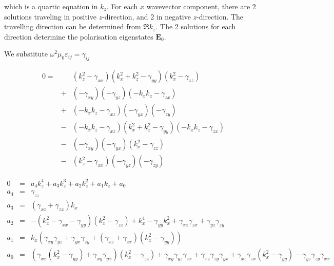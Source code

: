 \documentclass[12pt,a4paper,twoside,openright,BCOR10mm,headsepline,titlepage,abstracton,chapterprefix,final]{scrreprt}
\newcommand\Vector[1]{{\mathbf{#1}}}
\newcommand\vacuum{0}
\newcommand\wavenumber{k}
\newcommand\scalarEfield{E}
\newcommand\Efield{\Vector{\scalarEfield}}
\newcommand\vacuumpermeability{\scalarpermeability_{\vacuum}}
\newcommand\scalarpermeability{\mu}
\newcommand\scalarpermittivity{\varepsilon}
\begin{document}
which is a quartic equation in $\wavenumber_z$. 
For each $x$ wavevector component, there are 2 solutions traveling in positive $z$-direction, and 2 in negative $z$-direction.
The travelling direction can be determined from $\Re \wavenumber_z$. 
The 2 solutions for each direction determine the polarisation eigenstates $\Efield_0$.

We substitute $\omega^2 \vacuumpermeability \scalarpermittivity_{ij} = \gamma_{ij}$

\begin{eqnarray}
 0 =&&
     ( \wavenumber_z^2 -  \gamma_{xx} ) 
     ( \wavenumber_x^2 + \wavenumber_z^2 -  \gamma_{yy} )
     ( \wavenumber_x^2 -  \gamma_{zz} )
   \nonumber\\
   &+&
     ( -  \gamma_{xy} )  
     ( -  \gamma_{yz} )
     ( - \wavenumber_x \wavenumber_z -  \gamma_{zx} )
   \nonumber\\
   &+&
     ( - \wavenumber_x \wavenumber_z -  \gamma_{xz} )
     ( -  \gamma_{yx} )
     ( -  \gamma_{zy} )
   \nonumber\\
   &-&  
     ( - \wavenumber_x \wavenumber_z -  \gamma_{xz} )
     (   \wavenumber_x^2 + \wavenumber_z^2 -  \gamma_{yy} )
     ( - \wavenumber_x \wavenumber_z -  \gamma_{zx} )
   \nonumber\\
   &-&
     ( -  \gamma_{xy} )
     ( -  \gamma_{yx} )
     (   \wavenumber_x^2 -  \gamma_{zz} )
   \nonumber\\
   &-&
     (   \wavenumber_z^2 -  \gamma_{xx} )
     ( -  \gamma_{yz} )
     (  -  \gamma_{zy} )
\end{eqnarray}

\begin{eqnarray}
 0   &=& a_4 \wavenumber_z^4 + a_3 \wavenumber_z^3 + a_2 \wavenumber_z^2 + a_1 \wavenumber_z + a_0 \\
 a_4 &=& 
      \gamma_{zz} 
    \\
 a_3 &=& 
      (\gamma_{xz}+\gamma_{zx}) \wavenumber_x
    \\
 a_2 &=& 
     -  (\wavenumber_x^2 - \gamma_{xx} - \gamma_{yy}) ( \wavenumber_x^2 -  \gamma_{zz} )
     + \wavenumber_x^4
     - \gamma_{yy}  \wavenumber_x^2
     + \gamma_{xz} \gamma_{zx}
     + \gamma_{yz} \gamma_{zy}
    \\
a_1 &=& 
     \wavenumber_x 
     \left( 
        \gamma_{xy} \gamma_{yz} 
       + \gamma_{yx} \gamma_{zy}
       + (\gamma_{xz}+\gamma_{zx}) ( \wavenumber_x^2 - \gamma_{yy} )
     \right)
    \\
a_0 &=& 
     ( \gamma_{xx} (\wavenumber_x^2 - \gamma_{yy}) + \gamma_{xy} \gamma_{yx} ) ( \wavenumber_x^2 -  \gamma_{zz} )
     + \gamma_{xy} \gamma_{yz} \gamma_{zx}
     + \gamma_{xz} \gamma_{zy} \gamma_{yx}
     + \gamma_{xz} \gamma_{zx} ( \wavenumber_x^2 - \gamma_{yy} ) 
     - \gamma_{yz} \gamma_{zy} \gamma_{xx}    
\end{eqnarray}
\end{document}
